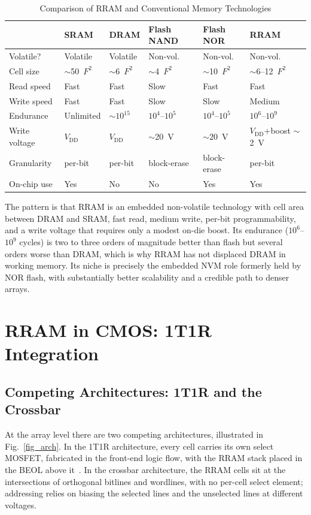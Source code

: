 \documentclass[lettersize,journal]{IEEEtran}
\begin{document}
\begin{table}[!t]
\caption{Comparison of RRAM and Conventional Memory Technologies\label{tab:memory_compare}}
\centering
\footnotesize
\renewcommand{\arraystretch}{1.2}
\begin{tabular}{|p{0.85in}|p{0.42in}|p{0.42in}|p{0.5in}|p{0.45in}|p{0.5in}|}
\hline
 & \textbf{SRAM} & \textbf{DRAM} & \textbf{Flash NAND} & \textbf{Flash NOR} & \textbf{RRAM} \\
\hline
Volatile? & Volatile & Volatile & Non-vol. & Non-vol. & Non-vol. \\
\hline
Cell size & $\sim$50~$F^2$ & $\sim$6~$F^2$ & $\sim$4~$F^2$ & $\sim$10~$F^2$ & $\sim$6--12~$F^2$ \\
\hline
Read speed & Fast & Fast & Slow & Fast & Fast \\
\hline
Write speed & Fast & Fast & Slow & Slow & Medium \\
\hline
Endurance & Unlimited & $\sim$$10^{15}$ & $10^4$--$10^5$ & $10^4$--$10^5$ & $10^6$--$10^9$ \\
\hline
Write voltage & $V_\mathrm{DD}$ & $V_\mathrm{DD}$ & $\sim$20~V & $\sim$20~V & $V_\mathrm{DD}$+boost $\sim$2~V \\
\hline
Granularity & per-bit & per-bit & block-erase & block-erase & per-bit \\
\hline
On-chip use & Yes & No & No & Yes & Yes \\
\hline
\end{tabular}
\end{table}

The pattern is that RRAM is an embedded non-volatile technology with cell area between DRAM and SRAM, fast read, medium write, per-bit programmability, and a write voltage that requires only a modest on-die boost. Its endurance ($10^6$--$10^9$ cycles) is two to three orders of magnitude better than flash but several orders worse than DRAM, which is why RRAM has not displaced DRAM in working memory. Its niche is precisely the embedded NVM role formerly held by NOR flash, with substantially better scalability and a credible path to denser arrays.

\section{RRAM in CMOS: 1T1R Integration}\label{sec:how}

\subsection{Competing Architectures: 1T1R and the Crossbar}
At the array level there are two competing architectures, illustrated in Fig.~\ref{fig_arch}. In the 1T1R architecture, every cell carries its own select MOSFET, fabricated in the front-end logic flow, with the RRAM stack placed in the BEOL above it~\cite{ref_niu2016}. In the crossbar architecture, the RRAM cells sit at the intersections of orthogonal bitlines and wordlines, with no per-cell select element; addressing relies on biasing the selected lines and the unselected lines at different voltages.
\end{document}
